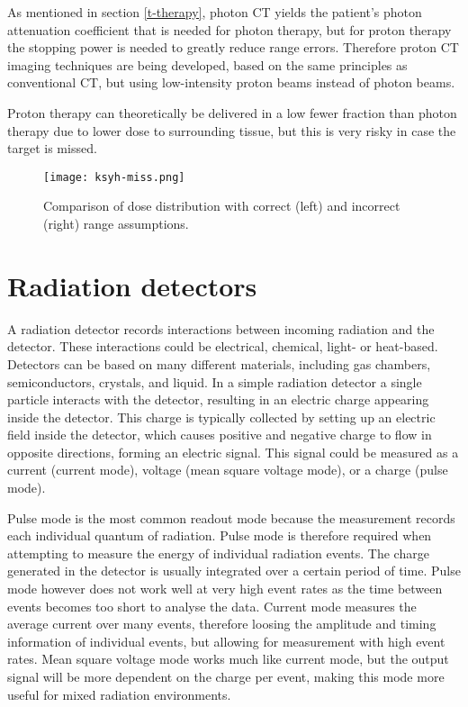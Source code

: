 \documentclass[../main/thesis.tex]{subfiles}
\begin{document}
As mentioned in section \ref{t-therapy}, photon \gls{CT} yields the patient's photon attenuation coefficient that is needed for photon therapy, but for proton therapy the stopping power is needed to greatly reduce range errors. Therefore proton \gls{CT} imaging techniques are being developed, based on the same principles as conventional \gls{CT}, but using low-intensity proton beams instead of photon beams. \citep{proton-ct}

Proton therapy can theoretically be delivered in a low fewer fraction than photon therapy due to lower dose to surrounding tissue, but this is very risky in case the target is missed.

\begin{figure}%
	\centering
	\texttt{[image: ksyh-miss.png]}
	\caption{Comparison of dose distribution with correct (left) and incorrect (right) range assumptions. \citep{ksyh-phys251}}
	\label{fig-miss}
\end{figure}

\section{Radiation detectors}
\label{t-detector}
A radiation detector records interactions between incoming radiation and the detector. These interactions could be electrical, chemical, light- or heat-based. Detectors can be based on many different materials, including gas chambers, semiconductors, crystals, and liquid. In a simple radiation detector a single particle interacts with the detector, resulting in an electric charge appearing inside the detector. This charge is typically collected by setting up an electric field inside the detector, which causes positive and negative charge to flow in opposite directions, forming an electric signal. This signal could be measured as a current (current mode), voltage (mean square voltage mode), or a charge (pulse mode). \citep[chap. 4]{Knoll}

Pulse mode is the most common readout mode because the measurement records each individual quantum of radiation. Pulse mode is therefore required when attempting to measure the energy of individual radiation events. The charge generated in the detector is usually integrated over a certain period of time. Pulse mode however does not work well at very high event rates as the time between events becomes too short to analyse the data. Current mode measures the average current over many events, therefore loosing the amplitude and timing information of individual events, but allowing for measurement with high event rates. Mean square voltage mode works much like current mode, but the output signal will be more dependent on the charge per event, making this mode more useful for mixed radiation environments. \citep[chap. 4]{Knoll}
\end{document}
